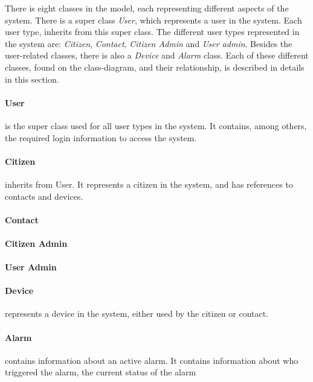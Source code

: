 There is eight classes in the model, each representing different aspects of the system. There is a super class \textit{User}, which represents a user in the system. Each user type, inherits from this super class. The different user types represented in the system are: \textit{Citizen}, \textit{Contact}, \textit{Citizen Admin} and \textit{User admin}. Besides the user-related classes, there is also a \textit{Device} and \textit{Alarm} class. Each of these different classes, found on the class-diagram, and their relationship, is described in details in this section.

\paragraph{User} is the super class used for all user types in the system. It contains, among others, the required login information to access the system.

\paragraph{Citizen} inherits from User. It represents a citizen in the system, and has references to contacts and devices. 

\paragraph{Contact}

\paragraph{Citizen Admin}

\paragraph{User Admin}

\paragraph{Device} represents a device in the system, either used by the citizen or contact.

\paragraph{Alarm} contains information about an active alarm. It contains information about who triggered the alarm, the current status of the alarm


